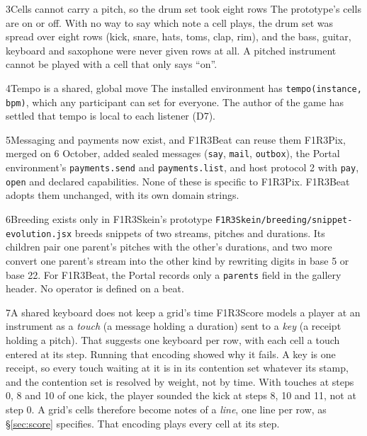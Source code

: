 \documentclass[11pt,a4paper]{article}
\newcommand{\code}[1]{\texttt{#1}}
\begin{document}
\begin{finding}{3}{Cells cannot carry a pitch, so the drum set took eight rows}
The prototype's cells are on or off. With no way to say which note a cell plays, the drum set
was spread over eight rows (kick, snare, hats, toms, clap, rim), and the bass, guitar, keyboard
and saxophone were never given rows at all. A pitched instrument cannot be played with a cell
that only says ``on''.
\end{finding}

\begin{finding}{4}{Tempo is a shared, global move}
The installed environment has \code{tempo(instance, bpm)}, which any participant can set for
everyone. The author of the game has settled that tempo is local to each listener (D7).
\end{finding}

\begin{finding}{5}{Messaging and payments now exist, and F1R3Beat can reuse them}
F1R3Pix, merged on 6 October, added sealed messages (\code{say}, \code{mail}, \code{outbox}),
the Portal environment's \code{payments.send} and \code{payments.list}, and host protocol 2
with \code{pay}, \code{open} and declared capabilities. None of these is specific to F1R3Pix.
F1R3Beat adopts them unchanged, with its own domain strings.
\end{finding}

\begin{finding}{6}{Breeding exists only in F1R3Skein's prototype}
\code{F1R3Skein/breeding/snippet-evolution.jsx} breeds snippets of two streams, pitches and
durations. Its children pair one parent's pitches with the other's durations, and two more
convert one parent's stream into the other kind by rewriting digits in base 5 or base 22. For
F1R3Beat, the Portal records only a \code{parents} field in the gallery header. No operator is
defined on a beat.
\end{finding}

\begin{finding}{7}{A shared keyboard does not keep a grid's time}
F1R3Score models a player at an instrument as a \emph{touch} (a message holding a duration)
sent to a \emph{key} (a receipt holding a pitch). That suggests one keyboard per row, with each
cell a touch entered at its step. Running that encoding showed why it fails. A key is one
receipt, so every touch waiting at it is in its contention set whatever its stamp, and the
contention set is resolved by weight, not by time. With touches at steps 0, 8 and 10 of one
kick, the player sounded the kick at steps 8, 10 and 11, not at step 0. A grid's cells
therefore become notes of a \emph{line}, one line per row, as \S\ref{sec:score} specifies. That
encoding plays every cell at its step.
\end{finding}
\end{document}
